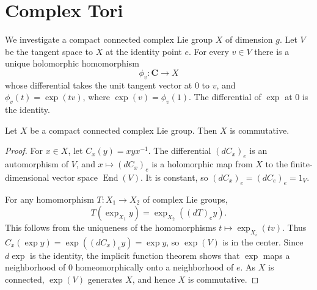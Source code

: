 
\section{Complex Tori}
\label{mumford-frag-I1}

We investigate a compact connected complex Lie group $X$ of dimension $g$.
Let $V$ be the tangent space to $X$ at the identity point $e$.  For every
$v\in V$ there is a unique holomorphic homomorphism
\[
 \phi_v:\mathbf C\longrightarrow X
\]
whose differential takes the unit tangent vector at $0$ to $v$, and
$\phi_v(t)=\exp(tv)$, where $\exp(v)=\phi_v(1)$.  The differential of
$\exp$ at $0$ is the identity.

\begin{theorem}
\label{mumford-frag-commutative}
Let $X$ be a compact connected complex Lie group.  Then $X$ is commutative.
\end{theorem}
\begin{proof}
For $x\in X$, let $C_x(y)=xyx^{-1}$.  The differential $(dC_x)_e$ is an
automorphism of $V$, and $x\mapsto(dC_x)_e$ is a holomorphic map from $X$ to
the finite-dimensional vector space $\operatorname{End}(V)$.  It is constant,
so $(dC_x)_e=(dC_e)_e=1_V$.

For any homomorphism $T:X_1\to X_2$ of complex Lie groups,
\[
 T(\exp_{X_1}y)=\exp_{X_2}((dT)_e y).
\]
This follows from the uniqueness of the homomorphisms
$t\mapsto\exp_{X_i}(tv)$.  Thus
$C_x(\exp y)=\exp((dC_x)_e y)=\exp y$, so $\exp(V)$ is in the center.
Since $d\exp$ is the identity, the implicit function theorem shows that
$\exp$ maps a neighborhood of $0$ homeomorphically onto a neighborhood of
$e$.  As $X$ is connected, $\exp(V)$ generates $X$, and hence $X$ is
commutative.
\end{proof}

